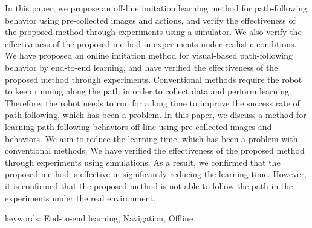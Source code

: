 In this paper, we propose an off-line imitation learning method for path-following behavior using pre-collected images and actions, and verify the effectiveness of the proposed method through experiments using a simulator. We also verify the effectiveness of the proposed method in experiments under realistic conditions. We have proposed an online imitation method for visual-based path-following behavior by end-to-end learning, and have verified the effectiveness of the proposed method through experiments. Conventional methods require the robot to keep running along the path in order to collect data and perform learning. Therefore, the robot needs to run for a long time to improve the success rate of path following, which has been a problem. In this paper, we discuss a method for learning path-following behaviors off-line using pre-collected images and behaviors. We aim to reduce the learning time, which has been a problem with conventional methods. We have verified the effectiveness of the proposed method through experiments using simulations. As a result, we confirmed that the proposed method is effective in significantly reducing the learning time. However, it is confirmed that the proposed method is not able to follow the path in the experiments under the real environment. 

\vspace{10mm}
keywords: End-to-end learning, Navigation, Offline 
